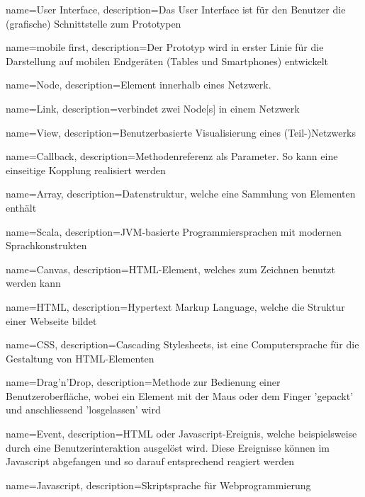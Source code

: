 {
    name=User Interface,
    description={Das User Interface ist für den Benutzer die (grafische) Schnittstelle zum Prototypen}
}

{
    name=mobile first,
    description={Der Prototyp wird in erster Linie für die Darstellung auf mobilen Endgeräten (Tables und Smartphones) entwickelt}
}

{
    name=Node,
    description={Element innerhalb eines Netzwerk.}
}

{
    name=Link,
    description={verbindet zwei \gls{Node}[s] in einem Netzwerk}
}

{
    name=View,
    description={Benutzerbasierte Visualisierung eines (Teil-)Netzwerks}
}

{
    name=Callback,
    description={Methodenreferenz als Parameter. So kann eine einseitige Kopplung realisiert werden}
}

{
    name=Array,
    description={Datenstruktur, welche eine Sammlung von Elementen enthält}
}

{
    name=Scala,
    description={JVM-basierte Programmiersprachen mit modernen Sprachkonstrukten}
}

{
    name=Canvas,
    description={\gls{HTML}-Element, welches zum Zeichnen benutzt werden kann}
}

{
    name=HTML,
    description={Hypertext Markup Language, welche die Struktur einer Webseite bildet}
}

{
    name=CSS,
    description={Cascading Stylesheets, ist eine Computersprache für die Gestaltung von \gls{HTML}-Elementen}
}

{
    name=Drag'n'Drop,
    description={Methode zur Bedienung einer Benutzeroberfläche, wobei ein Element mit der Maus oder dem Finger 'gepackt' und anschliessend 'losgelassen' wird}
}

{
    name=Event,
    description={\gls{HTML} oder \gls{Javascript}-Ereignis, welche beispielsweise durch eine Benutzerinteraktion ausgelöst wird. Diese Ereignisse können im \gls{Javascript} abgefangen und so darauf entsprechend reagiert werden}
}

{
    name=Javascript,
    description={Skriptsprache für Webprogrammierung}
}

